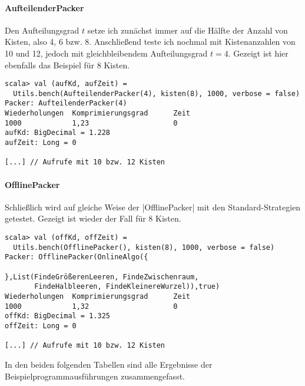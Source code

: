 \paragraph{AufteilenderPacker}
Den Aufteilungsgrad $t$ setze ich zunächst immer auf die Hälfte der Anzahl von Kisten, also 4, 6 bzw. 8.
Anschließend teste ich nochmal mit Kistenanzahlen von 10 und 12, jedoch mit gleichbleibendem Aufteilungsgrad $t = 4$.
Gezeigt ist hier ebenfalls das Beispiel für 8 Kisten.
\begin{lstlisting}
scala> val (aufKd, aufZeit) =
  Utils.bench(AufteilenderPacker(4), kisten(8), 1000, verbose = false)
Packer: AufteilenderPacker(4)
Wiederholungen  Komprimierungsgrad      Zeit
1000            1,23                    0
aufKd: BigDecimal = 1.228
aufZeit: Long = 0

[...] // Aufrufe mit 10 bzw. 12 Kisten
\end{lstlisting}

\paragraph{OfflinePacker}
Schließlich wird auf gleiche Weise der |OfflinePacker| mit den Standard-Strategien getestet. Gezeigt ist wieder der Fall für 8 Kisten.
\begin{lstlisting}
scala> val (offKd, offZeit) =
  Utils.bench(OfflinePacker(), kisten(8), 1000, verbose = false)
Packer: OfflinePacker(OnlineAlgo({

},List(FindeGrößerenLeeren, FindeZwischenraum,
       FindeHalbleeren, FindeKleinereWurzel)),true)
Wiederholungen  Komprimierungsgrad      Zeit
1000            1,32                    0
offKd: BigDecimal = 1.325
offZeit: Long = 0

[...] // Aufrufe mit 10 bzw. 12 Kisten
\end{lstlisting}
In den beiden folgenden Tabellen sind alle Ergebnisse der Beispielprogrammausführungen zusammengefasst.
